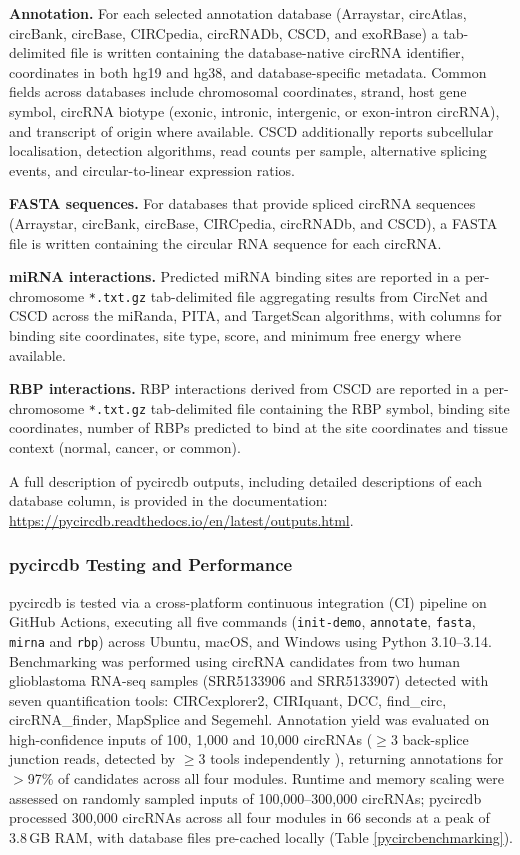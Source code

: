 \textbf{Annotation.}
For each selected annotation database (Arraystar, circAtlas, circBank, circBase, CIRCpedia, circRNADb, CSCD, and exoRBase) a tab-delimited file is written containing the database-native circRNA identifier, coordinates in both hg19 and hg38, and database-specific metadata. Common fields across databases include chromosomal coordinates, strand, host gene symbol, circRNA biotype (exonic, intronic, intergenic, or exon-intron circRNA), and transcript of origin where available. CSCD additionally reports subcellular localisation, detection algorithms, read counts per sample, alternative splicing events, and circular-to-linear expression ratios.

\textbf{FASTA sequences.}
For databases that provide spliced circRNA sequences (Arraystar, circBank, circBase, CIRCpedia, circRNADb, and CSCD), a FASTA file is written containing the circular RNA sequence for each circRNA.

\textbf{miRNA interactions.}
Predicted miRNA binding sites are reported in a per-chromosome \texttt{*.txt.gz} tab-delimited file aggregating results from CircNet and CSCD across the miRanda, PITA, and TargetScan algorithms, with columns for binding site coordinates, site type, score, and minimum free energy where available.

\textbf{RBP interactions.}
RBP interactions derived from CSCD are reported in a per-chromosome \texttt{*.txt.gz} tab-delimited file containing the RBP symbol, binding site coordinates, number of RBPs predicted to bind at the site coordinates and tissue context (normal, cancer, or common).

A full description of pycircdb outputs, including detailed descriptions of each database column, is provided in the documentation: \href{https://pycircdb.readthedocs.io/en/latest/outputs.html}{https://pycircdb.readthedocs.io/en/latest/outputs.html}.

\subsubsection{pycircdb Testing and Performance}
pycircdb is tested via a cross-platform continuous integration (CI) pipeline on GitHub Actions, executing all five commands (\texttt{init-demo}, \texttt{annotate}, \texttt{fasta}, \texttt{mirna} and \texttt{rbp}) across Ubuntu, macOS, and Windows using Python 3.10--3.14. Benchmarking was performed using circRNA candidates from two human glioblastoma RNA-seq samples (SRR5133906 and SRR5133907) detected with seven quantification tools: CIRCexplorer2, CIRIquant, DCC, find\_circ, circRNA\_finder, MapSplice and Segemehl. Annotation yield was evaluated on high-confidence inputs of 100, 1,000 and 10,000 circRNAs ($\geq$3 back-splice junction reads, detected by $\geq$3 tools independently \cite{Digby2023Dec}), returning annotations for $>$97\% of candidates across all four modules. Runtime and memory scaling were assessed on randomly sampled inputs of 100,000--300,000 circRNAs; pycircdb processed 300,000 circRNAs across all four modules in 66 seconds at a peak of 3.8\,GB RAM, with database files pre-cached locally (Table \ref{pycircbenchmarking}).



